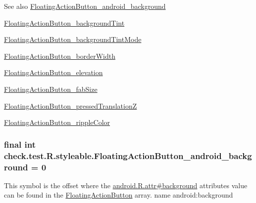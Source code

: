 \begin{DoxySeeAlso}{See also}
\hyperlink{classcheck_1_1test_1_1_r_1_1styleable_a72ad03dd3abdff80960d8174b01e6c87}{Floating\+Action\+Button\+\_\+android\+\_\+background} 

\hyperlink{classcheck_1_1test_1_1_r_1_1styleable_a1f3f7c01b4b7fd997c371ce60234abad}{Floating\+Action\+Button\+\_\+background\+Tint} 

\hyperlink{classcheck_1_1test_1_1_r_1_1styleable_a9a94417aa77b157ee8ca3ac5e289b662}{Floating\+Action\+Button\+\_\+background\+Tint\+Mode} 

\hyperlink{classcheck_1_1test_1_1_r_1_1styleable_a170afde9a336204ba95ce5648ffd3a65}{Floating\+Action\+Button\+\_\+border\+Width} 

\hyperlink{classcheck_1_1test_1_1_r_1_1styleable_af996a59bf7a9501bc11bbb4a5451900e}{Floating\+Action\+Button\+\_\+elevation} 

\hyperlink{classcheck_1_1test_1_1_r_1_1styleable_a9f7ddd112d179b839c66772f44baf8fc}{Floating\+Action\+Button\+\_\+fab\+Size} 

\hyperlink{classcheck_1_1test_1_1_r_1_1styleable_ae7c3b194d0b7e221bd1700bb86de5567}{Floating\+Action\+Button\+\_\+pressed\+Translation\+Z} 

\hyperlink{classcheck_1_1test_1_1_r_1_1styleable_a59b8eecd772872da56ad0f0984dee569}{Floating\+Action\+Button\+\_\+ripple\+Color} 
\end{DoxySeeAlso}
\hypertarget{classcheck_1_1test_1_1_r_1_1styleable_a72ad03dd3abdff80960d8174b01e6c87}{}
\subsubsection[{Floating\+Action\+Button\+\_\+android\+\_\+background}]{\setlength{\rightskip}{0pt plus 5cm}final int check.\+test.\+R.\+styleable.\+Floating\+Action\+Button\+\_\+android\+\_\+background = 0\hspace{0.3cm}{\ttfamily [static]}}\label{classcheck_1_1test_1_1_r_1_1styleable_a72ad03dd3abdff80960d8174b01e6c87}
This symbol is the offset where the \hyperlink{}{android.\+R.\+attr\#background} attribute\textquotesingle{}s value can be found in the \hyperlink{classcheck_1_1test_1_1_r_1_1styleable_ae6f501c03537511d2edaad8d699781da}{Floating\+Action\+Button} array.  name android\+:background \hypertarget{classcheck_1_1test_1_1_r_1_1styleable_a1f3f7c01b4b7fd997c371ce60234abad}{}

